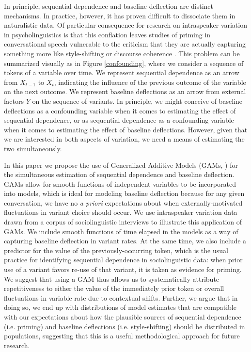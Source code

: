 \documentclass[12pt]{article}
\begin{document}
  
 In principle, sequential dependence and baseline deflection are distinct mechanisms. In practice, however, it has proven difficult to dissociate them in naturalistic data. Of particular consequence for research on intraspeaker variation in psycholinguistics is that this conflation leaves studies of priming in conversational speech vulnerable to the criticism that they are actually capturing something more like style-shifting or discourse coherence \citep{Szmrecsanyi:2006}. This problem can be summarized visually as in Figure \ref{confounding}, where we consider a sequence of tokens of a variable over time. We represent sequential dependence as an arrow from $X_{t-1}$ to $X_t$, indicating the influence of the previous outcome of the variable on the next outcome. We represent baseline deflections as an arrow from external factors $Y$ on the sequence of variants. In principle, we might conceive of baseline deflections as a confounding variable when it comes to estimating the effect of sequential dependence, or as sequential dependence as a confounding variable when it comes to estimating the effect of baseline deflections. However, given that we are interested in both aspects of variation, we need a means of estimating the two simultaneously.

 
 In this paper we propose the use of Generalized Additive Models (GAMs, \cite{hastie1990generalized}) for the simultaneous estimation of sequential dependence and baseline deflection.  GAMs allow for smooth functions of independent variables to be incorporated into models, which is ideal for modeling baseline deflection because for any given conversation, we have no \textit{a priori} expectations about when externally-motivated fluctuations in variant choice should occur. We use intraspeaker variation data drawn from a corpus of sociolinguistic interviews to illustrate this  application of GAMs. We include smooth functions of time elapsed in the models as a way of capturing baseline deflection in variant rates.  At the same time, we also include a predictor for the value of the previously-occurring token, which is the usual practice for identifying sequential dependence in sociolinguistic data: when prior use of a variant favors re-use of that variant, it is taken as evidence for priming. We suggest that using a GAM thus allows us to systematically attribute repetitiveness to either the value of the immediately prior token or overall fluctuations in variable rate due to contextual shifts. Further, we argue that in doing so, we end up with distributions of model estimates that are compatible with our expectations about how the plausible sources of sequential dependence (i.e. priming) and baseline deflections (i.e. style-shifting) should be distributed in populations, suggesting that this is a useful methodological approach for future research.
 
\end{document}
